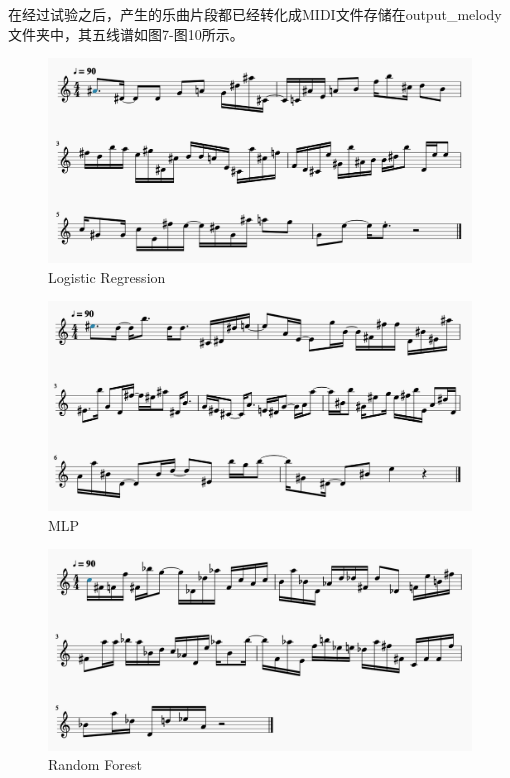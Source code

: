 \documentclass[UTF8,a4paper,10pt]{ctexart}
\begin{document}
在经过试验之后，产生的乐曲片段都已经转化成MIDI文件存储在output\_melody文件夹中，其五线谱如图7-图10所示。
\begin{figure}[H]
\begin{center}
	\includegraphics[width=1.0\columnwidth]{output_logreg_melody.png}
	\caption{Logistic Regression}
\end{center}
\end{figure}

\begin{figure}[H]
\begin{center}
	\includegraphics[width=1.0\columnwidth]{output_mlp_melody.png}
	\caption{MLP}
\end{center}
\end{figure}

\begin{figure}[H]
\begin{center}
	\includegraphics[width=1.0\columnwidth]{output_forest_melody.png}
	\caption{Random Forest}
\end{center}
\end{figure}
\end{document}
